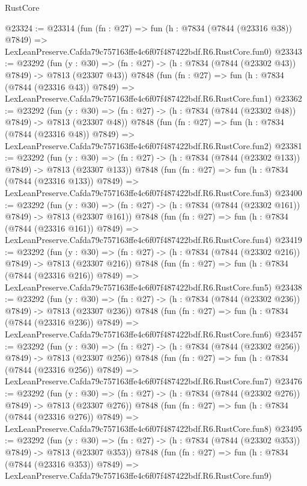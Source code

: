 \begin{lexlean}{RustCore}
\begin{coremodule}
@23324 := @23314
    (fun (fn : @27) =>
    fun (h : @7834 (@7844 (@23316 @38)) @7849) =>
    LexLeanPreserve.Cafda79c757163ffe4c6f07f487422bdf.R6.RustCore.fun0)
@23343 := @23292
    (fun (y : @30) => (fn : @27) -> (h : @7834 (@7844 (@23302 @43)) @7849) -> @7813 (@23307 @43))
    @7848
    (fun (fn : @27) =>
    fun (h : @7834 (@7844 (@23316 @43)) @7849) =>
    LexLeanPreserve.Cafda79c757163ffe4c6f07f487422bdf.R6.RustCore.fun1)
@23362 := @23292
    (fun (y : @30) => (fn : @27) -> (h : @7834 (@7844 (@23302 @48)) @7849) -> @7813 (@23307 @48))
    @7848
    (fun (fn : @27) =>
    fun (h : @7834 (@7844 (@23316 @48)) @7849) =>
    LexLeanPreserve.Cafda79c757163ffe4c6f07f487422bdf.R6.RustCore.fun2)
@23381 := @23292
    (fun (y : @30) => (fn : @27) -> (h : @7834 (@7844 (@23302 @133)) @7849) -> @7813 (@23307 @133))
    @7848
    (fun (fn : @27) =>
    fun (h : @7834 (@7844 (@23316 @133)) @7849) =>
    LexLeanPreserve.Cafda79c757163ffe4c6f07f487422bdf.R6.RustCore.fun3)
@23400 := @23292
    (fun (y : @30) => (fn : @27) -> (h : @7834 (@7844 (@23302 @161)) @7849) -> @7813 (@23307 @161))
    @7848
    (fun (fn : @27) =>
    fun (h : @7834 (@7844 (@23316 @161)) @7849) =>
    LexLeanPreserve.Cafda79c757163ffe4c6f07f487422bdf.R6.RustCore.fun4)
@23419 := @23292
    (fun (y : @30) => (fn : @27) -> (h : @7834 (@7844 (@23302 @216)) @7849) -> @7813 (@23307 @216))
    @7848
    (fun (fn : @27) =>
    fun (h : @7834 (@7844 (@23316 @216)) @7849) =>
    LexLeanPreserve.Cafda79c757163ffe4c6f07f487422bdf.R6.RustCore.fun5)
@23438 := @23292
    (fun (y : @30) => (fn : @27) -> (h : @7834 (@7844 (@23302 @236)) @7849) -> @7813 (@23307 @236))
    @7848
    (fun (fn : @27) =>
    fun (h : @7834 (@7844 (@23316 @236)) @7849) =>
    LexLeanPreserve.Cafda79c757163ffe4c6f07f487422bdf.R6.RustCore.fun6)
@23457 := @23292
    (fun (y : @30) => (fn : @27) -> (h : @7834 (@7844 (@23302 @256)) @7849) -> @7813 (@23307 @256))
    @7848
    (fun (fn : @27) =>
    fun (h : @7834 (@7844 (@23316 @256)) @7849) =>
    LexLeanPreserve.Cafda79c757163ffe4c6f07f487422bdf.R6.RustCore.fun7)
@23476 := @23292
    (fun (y : @30) => (fn : @27) -> (h : @7834 (@7844 (@23302 @276)) @7849) -> @7813 (@23307 @276))
    @7848
    (fun (fn : @27) =>
    fun (h : @7834 (@7844 (@23316 @276)) @7849) =>
    LexLeanPreserve.Cafda79c757163ffe4c6f07f487422bdf.R6.RustCore.fun8)
@23495 := @23292
    (fun (y : @30) => (fn : @27) -> (h : @7834 (@7844 (@23302 @353)) @7849) -> @7813 (@23307 @353))
    @7848
    (fun (fn : @27) =>
    fun (h : @7834 (@7844 (@23316 @353)) @7849) =>
    LexLeanPreserve.Cafda79c757163ffe4c6f07f487422bdf.R6.RustCore.fun9)

\end{coremodule}
\end{lexlean}
